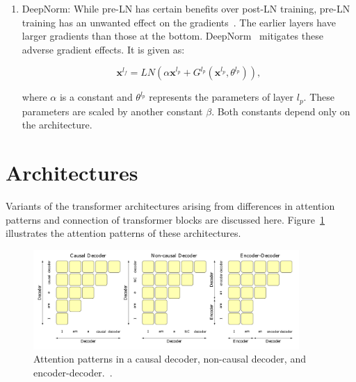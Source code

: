 \documentclass[a4paper,oneside]{book}
\begin{document}
\begin{enumerate}
    \item DeepNorm: While pre-LN has certain benefits over post-LN training, pre-LN training has an unwanted effect on the gradients~\cite{shleifer2021normformer}. The earlier layers have larger gradients than those at the bottom. DeepNorm~\cite{wang2022deepnet} mitigates these adverse gradient effects. It is given as:

          \begin{equation}
              \mathbf{x}^{l_{f}} = LN\left(\alpha \mathbf{x}^{l_{p}}+G^{l_{p}}\left(\mathbf{x}^{l_{p}}, \theta^{l_{p}}\right)\right),
          \end{equation}

          where $\alpha$ is a constant and $\theta^{l_{p}}$ represents the parameters of layer $l_{p}$. These parameters are scaled by another constant $\beta$. Both constants depend only on the architecture.
\end{enumerate}

\section{Architectures}
Variants of the transformer architectures arising from differences in attention patterns and connection of transformer blocks are discussed here. Figure~\ref{fig:attention_patterns} illustrates the attention patterns of these architectures.

\begin{figure}[H]
    \centering
    \includegraphics[width=0.9\textwidth]{img/attention_patterns}
    \caption{Attention patterns in a causal decoder, non-causal decoder, and encoder-decoder.~\cite{wang2022language}.}\label{fig:attention_patterns}
\end{figure}
\end{document}
